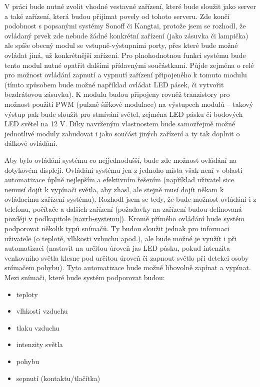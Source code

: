 V práci bude nutné zvolit vhodné vestavné zařízení, které bude sloužit jako server a také zařízení, která budou přijímat povely od tohoto serveru. Zde končí podobnost s popsanými systémy Sonoff či Kangtai, protože jsem se rozhodl, že ovládaný prvek zde nebude žádné konkrétní zařízení (jako zásuvka či lampička) ale spíše obecný modul se vstupně-výstupními porty, přes které bude možné ovládat jiná, už konkrétnější zařízení. Pro plnohodnotnou funkci systému bude tento modul nutné opatřit dalšími přídavnými součástkami. Půjde zejména o relé pro možnost ovládání zapnutí a vypnutí zařízení připojeného k tomuto modulu (tímto způsobem bude možné například ovládat LED pásek, či vytvořit bezdrátovou zásuvku). K modulu budou připojeny rovněž tranzistory pro možnost použití PWM (pulzně šířkové modulace) na výstupech modulů -- takový výstup pak bude sloužit pro stmívání světel, zejména LED pásku či bodových LED světel na 12 V. Díky navrženým vlastnostem bude samozřejmě možné jednotlivé moduly zabudovat i jako součást jiných zařízení a ty tak doplnit o dálkové ovládání.

Aby bylo ovládání systému co nejjednodušší, bude zde možnost ovládání na dotykovém displeji. Ovládání systému jen z jednoho místa však není v oblasti automatizace úplně nejlepším a efektivním řešením (například uživatel sice nemusí dojít k vypínači světla, aby zhasl, ale stejně musí dojít někam k ovládacímu zařízení systému). Rozhodl jsem se tedy, že bude možnost ovládání i z telefonu, počítače a dalších zařízení (požadavky na zařízení budou definovaná později v podkapitole \ref{navrh-systemu}). 
Kromě přímého ovládání bude systém podporovat několik typů snímačů. Ty budou sloužit jednak pro informaci uživatele (o teplotě, vlhkosti vzhuchu apod.), ale bude možné je využít i při automatizaci (nastavit na určitou úroveň jas LED pásku, pokud intenzita venkovního světla klesne pod určitou úroveň či zapnout světlo při detekci osoby snímačem pohybu). Tyto automatizace bude možné libovolně zapínat a vypínat. Mezi snímači, které bude systém podporovat budou:

\begin{itemize}
    \item teploty
    \item vlhkosti vzduchu
    \item tlaku vzduchu
    \item intenzity světla
    \item pohybu
    \item sepnutí (kontaktu/tlačítka)
\end{itemize}

